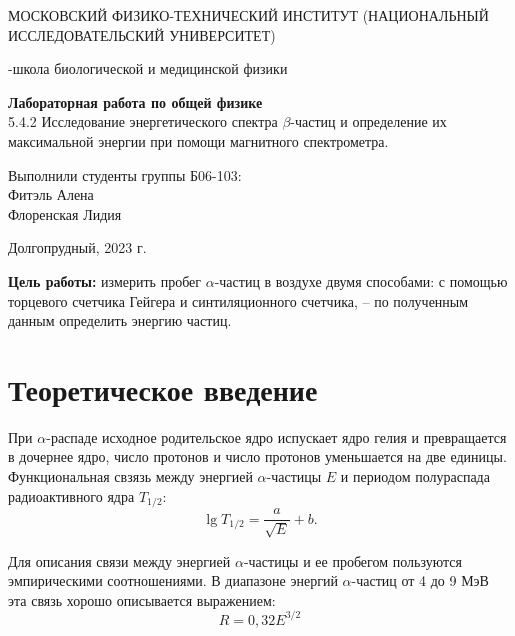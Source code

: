 \documentclass{article}
\begin{document}
\def\figurename{Рисунок}
\begin{titlepage}
\begin{center}
    {\large МОСКОВСКИЙ ФИЗИКО-ТЕХНИЧЕСКИЙ ИНСТИТУТ (НАЦИОНАЛЬНЫЙ ИССЛЕДОВАТЕЛЬСКИЙ УНИВЕРСИТЕТ)}
\end{center}
\begin{center}
    {-школа биологической и медицинской физики}
\end{center}

\vspace{1cm}
{\huge
\begin{center}
    {\bf Лабораторная работа по общей физике}\\
    \vspace{0.5cm}
    5.4.2 Исследование энергетического спектра $\beta$-частиц и определение их максимальной энергии при помощи магнитного спектрометра.
\end{center}
}

\vspace{4cm}
\begin{flushright}
{\LARGE Выполнили студенты группы Б06-103:\\ Фитэль Алена \\Флоренская Лидия\\}

\end{flushright}
\vspace{9cm}
\begin{center}
    Долгопрудный, 2023 г.
\end{center}
\end{titlepage}

\newpage
	\textbf{Цель работы:} измерить пробег $\alpha$-частиц в воздухе двумя способами: с помощью торцевого счетчика Гейгера и синтиляционного счетчика, -- по полученным данным определить энергию частиц.

\section{Теоретическое введение}
	При $\alpha$-распаде исходное родительское ядро испускает ядро гелия и превращается в дочернее ядро, число протонов и число протонов уменьшается на две единицы. Функциональная свзязь между энергией $\alpha$-частицы $E$ и периодом полураспада радиоактивного ядра $T_{1/2}$:
	\begin{equation*}
		 \lg T_{1/2} = \frac{a}{\sqrt{E}} + b.
	\end{equation*}
	
	Для описания связи между энергией $\alpha$-частицы и ее пробегом пользуются эмпирическими соотношениями. В диапазоне энергий $\alpha$-частиц от 4 до 9 МэВ эта связь хорошо описывается выражением:
	\begin{equation*}
		\label{eq:R(E)}
		\tag{$\star$}
		R = 0,32E^{3/2}
	\end{equation*}
	
\end{document}
